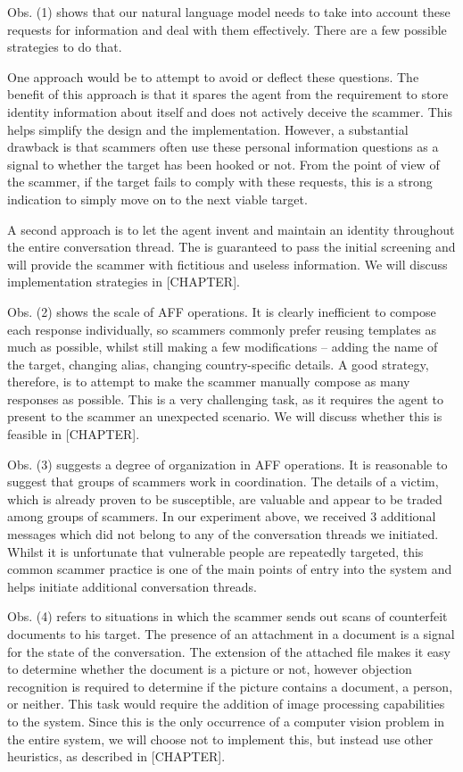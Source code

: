Obs. (1) shows that our natural language model needs to take into account these requests for information and deal with them effectively. There are a few possible strategies to do that. 

One approach would be to attempt to avoid or deflect these questions. The benefit of this approach is that it spares the agent from the requirement to store identity information about itself and does not actively deceive the scammer. This helps simplify the design and the implementation. However, a substantial drawback is that scammers often use these personal information questions as a signal to whether the target has been hooked or not. From the point of view of the scammer, if the target fails to comply with these requests, this is a strong indication to simply move on to the next viable target. 

A second approach is to let the agent invent and maintain an identity throughout the entire conversation thread. The is guaranteed to pass the initial screening and will provide the scammer with fictitious and useless information. We will discuss implementation strategies in [CHAPTER].

Obs. (2) shows the scale of AFF operations. It is clearly inefficient to compose each response individually, so scammers commonly prefer reusing templates as much as possible, whilst still making a few modifications – adding the name of the target, changing alias, changing country-specific details. A good strategy, therefore, is to attempt to make the scammer manually compose as many responses as possible. This is a very challenging task, as it requires the agent to present to the scammer an unexpected scenario. We will discuss whether this is feasible in [CHAPTER].

Obs. (3) suggests a degree of organization in AFF operations. It is reasonable to suggest that groups of scammers work in coordination. The details of a victim, which is already proven to be susceptible, are valuable and appear to be traded among groups of scammers. In our experiment above, we received 3 additional messages which did not belong to any of the conversation threads we initiated. Whilst it is unfortunate that vulnerable people are repeatedly targeted, this common scammer practice is one of the main points of entry into the system and helps initiate additional conversation threads.

Obs. (4) refers to situations in which the scammer sends out scans of counterfeit documents to his target. The presence of an attachment in a document is a signal for the state of the conversation. The extension of the attached file makes it easy to determine whether the document is a picture or not, however objection recognition is required to determine if the picture contains a document, a person,  or neither. This task would require the addition of image processing capabilities to the system. Since this is the only occurrence of a computer vision problem in the entire system, we will choose not to implement this, but instead use other heuristics, as described in [CHAPTER].


